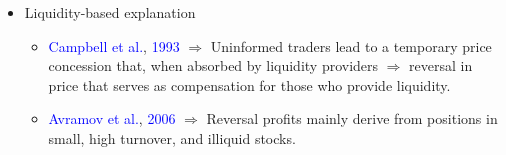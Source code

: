 \documentclass[pdf,10pt,xcolor=dvipsnames,hide notes]{beamer}
\begin{document}
\begin{frame}[label=frame1]
\begin{itemize}
\vspace{0.2cm}

\item Liquidity-based explanation 
\begin{itemize}
	\item \textcolor{blue}{Campbell et al.}, \textcolor{blue}{1993} $\Rightarrow$ Uninformed traders lead to a temporary price concession that, when absorbed by liquidity providers $\Rightarrow$ reversal in price that serves as compensation for those who provide liquidity.
	\item \textcolor{blue}{Avramov et al.}, \textcolor{blue}{2006} $\Rightarrow$ Reversal profits mainly derive from positions in small, high turnover, and illiquid stocks.
\end{itemize}
	

\end{itemize}
\end{frame}
\end{document}
